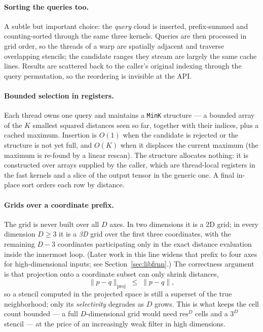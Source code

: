 \documentclass[11pt]{article}
\begin{document}
\paragraph{Sorting the queries too.}
A subtle but important choice: the \emph{query} cloud is inserted, prefix-summed
and counting-sorted through the same three kernels. Queries are then processed
in grid order, so the threads of a warp are spatially adjacent and traverse
overlapping stencils; the candidate ranges they stream are largely the same
cache lines. Results are scattered back to the caller's original indexing
through the query permutation, so the reordering is invisible at the API.

\paragraph{Bounded selection in registers.}
Each thread owns one query and maintains a \texttt{MinK} structure --- a
bounded array of the $K$ smallest squared distances seen so far, together with
their indices, plus a cached maximum. Insertion is $O(1)$ when the candidate is
rejected or the structure is not yet full, and $O(K)$ when it displaces the
current maximum (the maximum is re-found by a linear rescan). The structure
allocates nothing: it is constructed over arrays supplied by the caller, which
are thread-local registers in the fast kernels and a slice of the output tensor
in the generic one. A final in-place sort orders each row by distance.

\paragraph{Grids over a coordinate prefix.}
The grid is never built over all $D$ axes. In two dimensions it is a 2D grid; in
every dimension $D \ge 3$ it is a \emph{3D} grid over the first three
coordinates, with the remaining $D-3$ coordinates participating only in the
exact distance evaluation inside the innermost loop. (Later work in this line
widens that prefix to four axes for high-dimensional inputs; see
Section~\ref{sec:libfrnn}.) The correctness argument is that projection onto a
coordinate subset can only shrink distances,
\[
  \lVert p - q \rVert_{\text{proj}} \;\le\; \lVert p - q \rVert,
\]
so a stencil computed in the projected space is still a superset of the true
neighborhood; only its \emph{selectivity} degrades as $D$ grows. This is what
keeps the cell count bounded --- a full $D$-dimensional grid would need
$\text{res}^{D}$ cells and a $3^{D}$ stencil --- at the price of an increasingly
weak filter in high dimensions.
\end{document}
